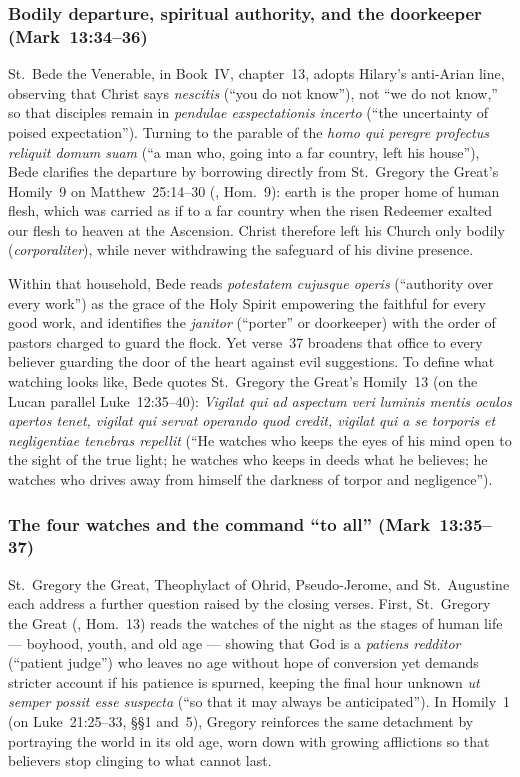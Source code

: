 \subsubsection{Bodily departure, spiritual authority, and the doorkeeper (Mark~13:34--36)}
St.~Bede the Venerable, in  Book~IV, chapter~13, adopts Hilary's anti-Arian line, observing that Christ says \emph{nescitis} (``you do not know''), not ``we do not know,'' so that disciples remain in \emph{pendulae exspectationis incerto} (``the uncertainty of poised expectation''). Turning to the parable of the \emph{homo qui peregre profectus reliquit domum suam} (``a man who, going into a far country, left his house''), Bede clarifies the departure by borrowing directly from St.~Gregory the Great's Homily~9 on Matthew~25:14--30 (, Hom.~9): earth is the proper home of human flesh, which was carried as if to a far country when the risen Redeemer exalted our flesh to heaven at the Ascension. Christ therefore left his Church only bodily (\emph{corporaliter}), while never withdrawing the safeguard of his divine presence.

Within that household, Bede reads \emph{potestatem cujusque operis} (``authority over every work'') as the grace of the Holy Spirit empowering the faithful for every good work, and identifies the \emph{janitor} (``porter'' or doorkeeper) with the order of pastors charged to guard the flock. Yet verse~37 broadens that office to every believer guarding the door of the heart against evil suggestions. To define what watching looks like, Bede quotes St.~Gregory the Great's Homily~13 (on the Lucan parallel Luke~12:35--40): \emph{Vigilat qui ad aspectum veri luminis mentis oculos apertos tenet, vigilat qui servat operando quod credit, vigilat qui a se torporis et negligentiae tenebras repellit} (``He watches who keeps the eyes of his mind open to the sight of the true light; he watches who keeps in deeds what he believes; he watches who drives away from himself the darkness of torpor and negligence'').

\subsubsection{The four watches and the command ``to all'' (Mark~13:35--37)}
St.~Gregory the Great, Theophylact of Ohrid, Pseudo-Jerome, and St.~Augustine each address a further question raised by the closing verses. First, St.~Gregory the Great (, Hom.~13) reads the watches of the night as the stages of human life --- boyhood, youth, and old age --- showing that God is a \emph{patiens redditor} (``patient judge'') who leaves no age without hope of conversion yet demands stricter account if his patience is spurned, keeping the final hour unknown \emph{ut semper possit esse suspecta} (``so that it may always be anticipated''). In Homily~1 (on Luke~21:25--33, §§1 and~5), Gregory reinforces the same detachment by portraying the world in its old age, worn down with growing afflictions so that believers stop clinging to what cannot last.

